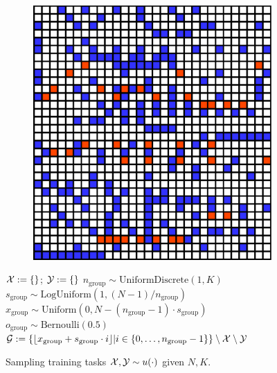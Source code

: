\begin{figure}
\begin{minipage}[t]{0.35\textwidth}
\begin{figure}[H]
\includegraphics[width=\textwidth]{figs/fdm/training.pdf}
\end{figure}
\end{minipage}
\hfill
\begin{minipage}[t]{0.63\textwidth}
\begin{algorithm}[H]
    \caption{Sampling training tasks $\mathcal{X},\mathcal{Y}\sim u(\cdot)$ given $N,K$.}\label{alg:mask-distribution}
    \label{alg:training-distribution}
    \footnotesize
    \begin{algorithmic}[1]
      \State $\mathcal{X} := \{\}$; $\mathcal{Y} := \{\}$
        \State $n_\text{group} \sim \text{UniformDiscrete}(1, K)$ %
        \State $s_\text{group} \sim \text{LogUniform}(1, (N-1)/n_\text{group})$ %
        \State $x_\text{group} \sim \text{Uniform}(0, N-(n_\text{group}-1)\cdot s_\text{group})$ %
        \State $o_\text{group} \sim \text{Bernoulli}(0.5)$
        \State $\mathcal{G} := \{\lfloor x_\text{group} + s_\text{group} \cdot i \rfloor | i \in \{0,\ldots,n_\text{group}-1\} \} \setminus \mathcal{X} \setminus \mathcal{Y}$ \label{line:make-G}

\end{algorithmic}
\end{algorithm}
\end{minipage}
\end{figure}

